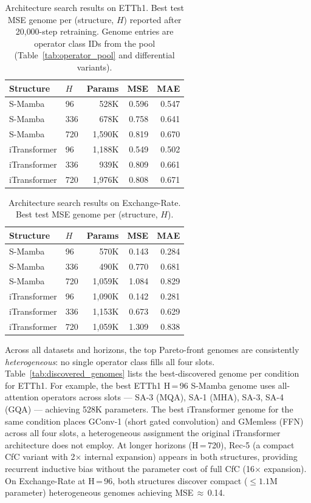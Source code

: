 \begin{table}[t]
\caption{Architecture search results on ETTh1. Best test MSE genome per (structure, $H$) reported after 20{,}000-step retraining. Genome entries are operator class IDs from the pool (Table~\ref{tab:operator_pool} and differential variants).}
\label{tab:exp1_etth1}
\centering
\small
\begin{tabular}{llrrr}
\toprule
Structure & $H$ & Params & MSE & MAE \\
\midrule
S-Mamba   & 96  & 528K  & 0.596 & 0.547 \\
S-Mamba   & 336 & 678K  & 0.758 & 0.641 \\
S-Mamba   & 720 & 1{,}590K & 0.819 & 0.670 \\
\midrule
iTransformer & 96  & 1{,}188K & 0.549 & 0.502 \\
iTransformer & 336 & 939K  & 0.809 & 0.661 \\
iTransformer & 720 & 1{,}976K & 0.808 & 0.671 \\
\bottomrule
\end{tabular}
\end{table}

\begin{table}[t]
\caption{Architecture search results on Exchange-Rate. Best test MSE genome per (structure, $H$).}
\label{tab:exp1_exchange}
\centering
\small
\begin{tabular}{llrrr}
\toprule
Structure & $H$ & Params & MSE & MAE \\
\midrule
S-Mamba   & 96  & 570K  & 0.143 & 0.284 \\
S-Mamba   & 336 & 490K  & 0.770 & 0.681 \\
S-Mamba   & 720 & 1{,}059K & 1.084 & 0.829 \\
\midrule
iTransformer & 96  & 1{,}090K & 0.142 & 0.281 \\
iTransformer & 336 & 1{,}153K & 0.673 & 0.629 \\
iTransformer & 720 & 1{,}059K & 1.309 & 0.838 \\
\bottomrule
\end{tabular}
\end{table}

Across all datasets and horizons, the top Pareto-front genomes are consistently \emph{heterogeneous}: no single operator class fills all four slots.
Table~\ref{tab:discovered_genomes} lists the best-discovered genome per condition for ETTh1.
For example, the best ETTh1 H\,=\,96 S-Mamba genome uses all-attention operators across slots — SA-3 (MQA), SA-1 (MHA), SA-3, SA-4 (GQA) — achieving 528K parameters.
The best iTransformer genome for the same condition places GConv-1 (short gated convolution) and GMemless (FFN) across all four slots, a heterogeneous assignment the original iTransformer architecture does not employ.
At longer horizons (H\,=\,720), Rec-5 (a compact CfC variant with 2$\times$ internal expansion) appears in both structures, providing recurrent inductive bias without the parameter cost of full CfC (16$\times$ expansion).
On Exchange-Rate at H\,=\,96, both structures discover compact (${\le}1.1$M parameter) heterogeneous genomes achieving MSE\,$\approx$\,0.14.

